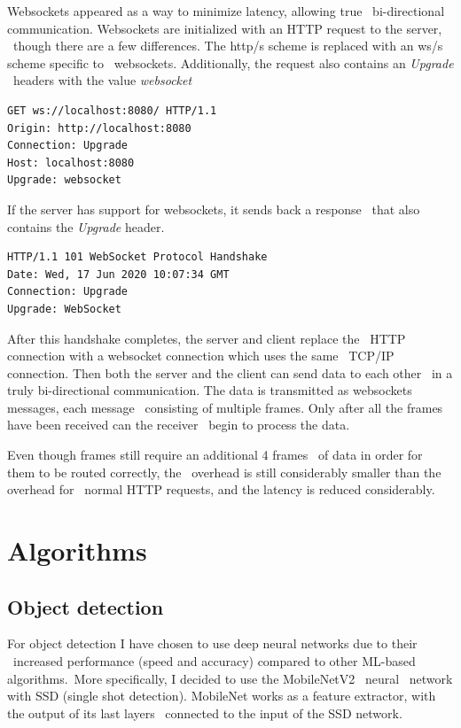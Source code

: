 Websockets appeared as a way to minimize latency, allowing true \
bi-directional communication.
Websockets are initialized with an HTTP request to the server, \
though there are a few differences.
The http/s scheme is replaced with an ws/s scheme specific to \
websockets.
Additionally, the request also contains an \textit{Upgrade} \
headers with the value \textit{websocket}

\begin{verbatim}
GET ws://localhost:8080/ HTTP/1.1
Origin: http://localhost:8080
Connection: Upgrade
Host: localhost:8080
Upgrade: websocket
\end{verbatim}

If the server has support for websockets, it sends back a response \
that also contains the \textit{Upgrade} header.

\begin{verbatim}
HTTP/1.1 101 WebSocket Protocol Handshake
Date: Wed, 17 Jun 2020 10:07:34 GMT
Connection: Upgrade
Upgrade: WebSocket
\end{verbatim}

After this handshake completes, the server and client replace the \
HTTP connection with a websocket connection which uses the same \
TCP/IP connection.
Then both the server and the client can send data to each other \
in a truly bi-directional communication.
The data is transmitted as websockets messages, each message \
consisting of multiple frames.
Only after all the frames have been received can the receiver \
begin to process the data.

Even though frames still require an additional 4\-12 frames \
of data in order for them to be routed correctly, the \
overhead is still considerably smaller than the overhead for \
normal HTTP requests, and the latency is reduced considerably.


\section{Algorithms}
\label{sec:analysis-algorithms}

\subsection{Object detection}
\label{subsec:analysis-object-detection}

For object detection I have chosen to use deep neural networks due to their \
increased performance (speed and accuracy) compared to other ML-based algorithms.\
More specifically, I decided to use the  MobileNetV2~\cite{mobilenet2} neural \
network with SSD (single shot detection).
MobileNet works as a feature extractor, with the output of its last layers \
connected to the input of the SSD network.

